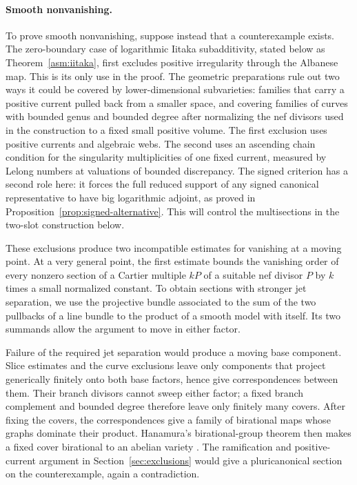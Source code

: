 \paragraph{Smooth nonvanishing.}
To prove smooth nonvanishing, suppose instead that a counterexample exists.
The zero-boundary case of logarithmic Iitaka subadditivity, stated below
as Theorem~\ref{asm:iitaka}, first excludes positive irregularity through
the Albanese map. This is its only use in the proof.
The geometric preparations rule out two ways it could be covered by
lower-dimensional subvarieties: families that carry a positive current
pulled back from a smaller space, and covering families of curves with bounded genus
and bounded degree after normalizing the nef divisors used in the
construction to a fixed small positive volume. The first exclusion uses positive currents and algebraic webs.
The second uses an ascending chain condition for the singularity
multiplicities of one fixed current, measured by Lelong numbers at valuations
of bounded discrepancy.
The signed criterion has a second role here: it forces the full reduced
support of any signed canonical representative to have big logarithmic
adjoint, as proved in Proposition~\ref{prop:signed-alternative}. This will
control the multisections in the two-slot construction below.

These exclusions produce two incompatible estimates for vanishing at a
moving point. At a very general point, the first estimate bounds the
vanishing order of every nonzero section of a Cartier multiple $kP$ of a suitable
nef divisor $P$ by $k$ times a small normalized constant.
To obtain sections with stronger jet separation, we use the
projective bundle associated to the sum of the two pullbacks of a line bundle
to the product of a smooth model with itself. Its two summands allow the
argument to move in either factor.

Failure of the required jet separation would produce a moving base
component. Slice estimates and the curve exclusions leave only components
that project generically finitely onto both base factors, hence give
correspondences between them. Their branch divisors cannot sweep either
factor; a fixed branch complement and bounded degree therefore leave only
finitely many covers. After fixing the covers, the correspondences give
a family of birational maps whose graphs dominate their product. Hanamura's
birational-group theorem then makes a fixed cover birational to an abelian
variety \cite[Theorems~2.1--2.2]{Hanamura1988}. The ramification and
positive-current argument in Section~\ref{sec:exclusions} would give a
pluricanonical section on the counterexample, again a contradiction.

